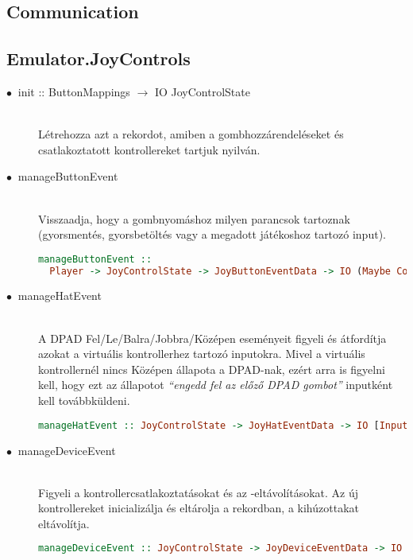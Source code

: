 \subsection{Communication}

\subsection{Emulator.JoyControls}

\begin{description}
	\item[$\bullet\:$ init :: ButtonMappings $\rightarrow$ IO JoyControlState] \hfill \\
	Létrehozza azt a rekordot, amiben a gombhozzárendeléseket és csatlakoztatott kontrollereket tartjuk nyilván.
	\item[$\bullet\:$ manageButtonEvent] \hfill \\
	Visszaadja, hogy a gombnyomáshoz milyen parancsok tartoznak (gyorsmentés, gyorsbetöltés vagy a megadott játékoshoz tartozó input).
\vspace{0.2cm}
\begin{lstlisting}[language=Haskell, basicstyle=\scriptsize]
manageButtonEvent :: 
  Player -> JoyControlState -> JoyButtonEventData -> IO (Maybe Command)
\end{lstlisting}
	\item[$\bullet\:$ manageHatEvent] \hfill \\
	A DPAD Fel/Le/Balra/Jobbra/Középen eseményeit figyeli és átfordítja azokat a virtuális kontrollerhez tartozó inputokra. Mivel a virtuális kontrollernél nincs Középen állapota a DPAD-nak, ezért arra is figyelni kell, hogy ezt az állapotot \emph{``engedd fel az előző DPAD gombot''} inputként kell továbbküldeni.
    \vspace{0.2cm}
\begin{lstlisting}[language=Haskell, basicstyle=\scriptsize]
manageHatEvent :: JoyControlState -> JoyHatEventData -> IO [Input]
\end{lstlisting}
	\item[$\bullet\:$ manageDeviceEvent] \hfill \\
	Figyeli a kontrollercsatlakoztatásokat és az -eltávolításokat.
	Az új kontrollereket inicializálja és eltárolja a rekordban, a kihúzottakat eltávolítja.
	\vspace{0.2cm}
\begin{lstlisting}[language=Haskell, basicstyle=\scriptsize]
manageDeviceEvent :: JoyControlState -> JoyDeviceEventData -> IO ()
\end{lstlisting}
\end{description}

